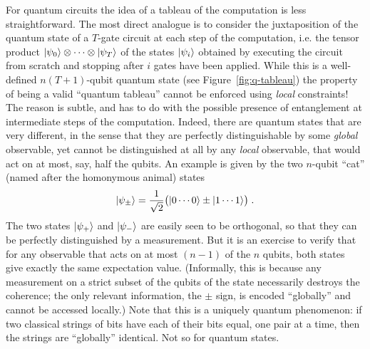 For quantum circuits the idea of a tableau of the computation is less straightforward. The most direct analogue is to consider the juxtaposition of the quantum state of a $T$-gate circuit at each step of the computation, i.e. the tensor product $|\psi_0\rangle\otimes \cdots\otimes |\psi_T\rangle$ of the states $|\psi_i\rangle$ obtained by executing the circuit from scratch and stopping after $i$ gates have been applied. While this is a well-defined $n(T+1)$-qubit quantum state (see Figure~\ref{fig:q-tableau}) the property of being a valid ``quantum tableau'' cannot be enforced using \emph{local} constraints! The reason is subtle, and has to do with the possible presence of entanglement at intermediate steps of the computation. Indeed, there are quantum states that are very different, in the sense that they are perfectly distinguishable by some \emph{global} observable, yet cannot be distinguished at all by any \emph{local} observable, that would act on at most, say, half the qubits. An example is given by the two $n$-qubit ``cat'' (named after the homonymous animal) states
\[ |\psi_{\pm}\rangle = \frac{1}{\sqrt{2}} \big( |0\cdots 0\rangle \pm |1\cdots 1\rangle \big)\;.\]
The two states $|\psi_+\rangle$ and $|\psi_-\rangle$ are easily seen to be orthogonal, so that they can be perfectly distinguished by a measurement. But it is an exercise to verify that for any observable that acts on at most $(n-1)$ of the $n$ qubits, both states give exactly the same expectation value. (Informally, this is because any measurement on a strict subset of the qubits of the state necessarily destroys the coherence; the only relevant information, the $\pm$ sign, is encoded ``globally'' and cannot be accessed locally.)
Note that this is a uniquely quantum phenomenon: if two classical strings of bits have each of their bits equal, one pair at a time, then the strings are ``globally'' identical. Not so for quantum states.

